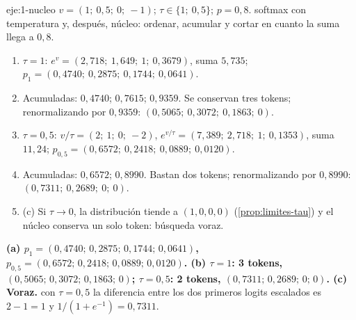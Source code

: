 \begin{solucion}{eje:1-nucleo}
\datos $v=(1;\allowbreak\ 0{,}5;\allowbreak\ 0;\allowbreak\ -1)$; $\tau\in\{1;\allowbreak\ 0{,}5\}$; $p=0{,}8$.
\planteamiento softmax con temperatura y, después, núcleo: ordenar, acumular y cortar en cuanto la suma llega a $0{,}8$.
\pasos
\begin{enumerate}[label=\arabic*.]
  \item $\tau=1$: $e^{v}=(2{,}718;\allowbreak\ 1{,}649;\allowbreak\ 1;\allowbreak\ 0{,}3679)$, suma $5{,}735$; $p_1=(0{,}4740;\allowbreak\ 0{,}2875;\allowbreak\ 0{,}1744;\allowbreak\ 0{,}0641)$.
  \item Acumuladas: $0{,}4740$; $0{,}7615$; $0{,}9359$. Se conservan tres tokens; renormalizando por $0{,}9359$: $(0{,}5065;\allowbreak\ 0{,}3072;\allowbreak\ 0{,}1863;\allowbreak\ 0)$.
  \item $\tau=0{,}5$: $v/\tau=(2;\allowbreak\ 1;\allowbreak\ 0;\allowbreak\ -2)$, $e^{v/\tau}=(7{,}389;\allowbreak\ 2{,}718;\allowbreak\ 1;\allowbreak\ 0{,}1353)$, suma $11{,}24$; $p_{0{,}5}=(0{,}6572;\allowbreak\ 0{,}2418;\allowbreak\ 0{,}0889;\allowbreak\ 0{,}0120)$.
  \item Acumuladas: $0{,}6572$; $0{,}8990$. Bastan dos tokens; renormalizando por $0{,}8990$: $(0{,}7311;\allowbreak\ 0{,}2689;\allowbreak\ 0;\allowbreak\ 0)$.
  \item (c) Si $\tau\to 0$, la distribución tiende a $(1,0,0,0)$ (\cref{prop:limites-tau}) y el núcleo conserva un solo token: búsqueda voraz.
\end{enumerate}
\resultado \textbf{(a) $p_1=(0{,}4740;\allowbreak\,0{,}2875;\allowbreak\,0{,}1744;\allowbreak\,0{,}0641)$, $p_{0{,}5}=(0{,}6572;\allowbreak\,0{,}2418;\allowbreak\,0{,}0889;\allowbreak\,0{,}0120)$. (b) $\tau=1$: 3 tokens, $(0{,}5065;\allowbreak\,0{,}3072;\allowbreak\,0{,}1863;\allowbreak\,0)$; $\tau=0{,}5$: 2 tokens, $(0{,}7311;\allowbreak\,0{,}2689;\allowbreak\,0;\allowbreak\,0)$. (c) Voraz.}
\comprobacion con $\tau=0{,}5$ la diferencia entre los dos primeros logits escalados es $2-1=1$ y $1/(1+e^{-1})=0{,}7311$.
\end{solucion}

